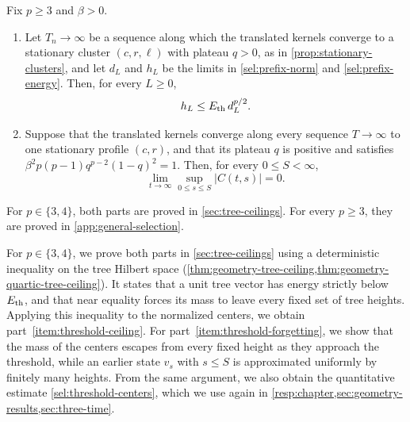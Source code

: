 \begin{proposition}\label{prop:threshold-inputs}
Fix $p\ge3$ and $\beta>0$.
\begin{enumerate}[label=(\alph*)]
\item\label{item:threshold-ceiling}
Let $T_n\to\infty$ be a sequence along which the translated kernels converge to a stationary cluster $(c,r,\ell)$ with plateau $q>0$, as in \cref{prop:stationary-clusters}, and let $d_L$ and $h_L$ be the limits in \eqref{sel:prefix-norm} and \eqref{sel:prefix-energy}. Then, for every $L\ge0$,
\begin{equation}\label{eq:threshold-input-ceiling}
 h_L\le E_{\mathrm{th}}\, d_L^{p/2}.
\end{equation}
\item\label{item:threshold-forgetting}
Suppose that the translated kernels converge along every sequence $T\to\infty$ to one stationary profile $(c,r)$, and that its plateau $q$ is positive and satisfies $\beta^2p(p-1)q^{p-2}(1-q)^2=1$. Then, for every $0\le S<\infty$,
\begin{equation}\label{eq:threshold-input-forgetting}
 \lim_{t\to\infty}\sup_{0\le s\le S}|C(t,s)|=0.
\end{equation}
\end{enumerate}
For $p\in\{3,4\}$, both parts are proved in \cref{sec:tree-ceilings}. For every $p\ge3$, they are proved in \cref{app:general-selection}.
\end{proposition}

For $p\in\{3,4\}$, we prove both parts in \cref{sec:tree-ceilings} using a deterministic inequality on the tree Hilbert space (\cref{thm:geometry-tree-ceiling,thm:geometry-quartic-tree-ceiling}). It states that a unit tree vector has energy strictly below $E_{\mathrm{th}}$, and that near equality forces its mass to leave every fixed set of tree heights. Applying this inequality to the normalized centers, we obtain part~\ref{item:threshold-ceiling}. For part~\ref{item:threshold-forgetting}, we show that the mass of the centers escapes from every fixed height as they approach the threshold, while an earlier state $v_s$ with $s\le S$ is approximated uniformly by finitely many heights. From the same argument, we also obtain the quantitative estimate \cref{sel:threshold-centers}, which we use again in \cref{resp:chapter,sec:geometry-results,sec:three-time}.

